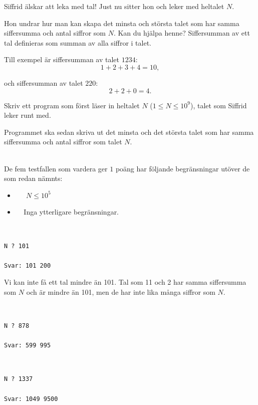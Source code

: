 \newpage
{}

Siffrid älskar att leka med tal! Just nu sitter hon och leker med heltalet $N$.

Hon undrar hur man kan skapa det minsta och största talet som har samma siffersumma och antal siffror som $N$.
Kan du hjälpa henne?
Siffersumman av ett tal definieras som summan av alla siffror i talet. 

\noindent
Till exempel är siffersumman av talet $1234$: 
$$
1 + 2 + 3 + 4 = 10,
$$

och siffersumman av talet $220$:
$$
2 + 2 + 0 = 4.
$$

Skriv ett program som först läser in heltalet $N$ ($1 \leq N \leq 10^9$), talet som Siffrid leker runt med.

Programmet ska sedan skriva ut det minsta och det största talet som har samma siffersumma och antal siffror som talet $N$.

\vspace{0.5cm}
\\
De fem testfallen som vardera ger $1$ poäng har följande begränsningar utöver de som redan nämnts:
\begin{itemize}
    \item[(1-2)] $\;\;\;\;$ $N \leq 10^5$    
    \item[(3-5)] $\;\;\;\;$Inga ytterligare begränsningar.
\end{itemize}

\vspace{0.5cm}
\\
\vspace{-0.3cm}
\begin{verbatim}
N ? 101

Svar: 101 200
\end{verbatim}
 Vi kan inte få ett tal mindre än 101. Tal som 11 och 2 har samma siffersumma som $N$ och är mindre än 101, men de har inte
lika många siffror som $N$.

\vspace{0.3cm}
\\
\vspace{-0.3cm}
\begin{verbatim}
N ? 878

Svar: 599 995
\end{verbatim}
\vspace{0.3cm}

\\
\vspace{-0.3cm}
\begin{verbatim}
N ? 1337

Svar: 1049 9500
\end{verbatim}


